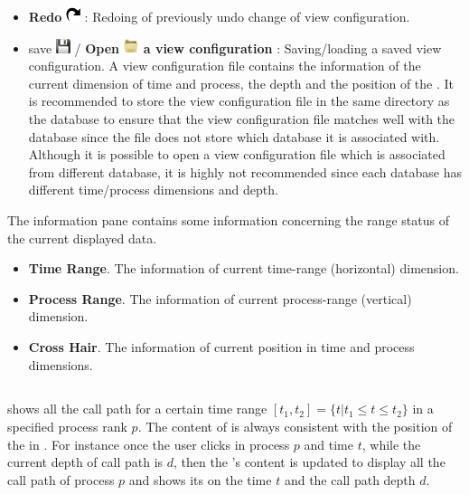 \begin{itemize}
\item \textbf{Redo} \includegraphics[scale=.5]{fig/hpctraceviewer-button-redo.png} : Redoing of previously undo change of view configuration.
\item save \includegraphics[scale=.5]{fig/hpctraceviewer-button-save.png}  / \textbf{Open \includegraphics[scale=.7]{fig/hpctraceviewer-button-open.png} a view configuration} : Saving/loading a saved view configuration. 
A view configuration file contains the information of the current dimension of time and process, the depth and the position of the \crosshair{}. 
It is recommended to store the view configuration file in the same directory as the database to ensure that the view configuration file matches well with the database since the file does not store which database it is associated with. 
Although it is possible to open a view configuration file which is associated from different database, it is highly not recommended since each database has different time/process dimensions and depth.


\end{itemize}

The information pane contains some information concerning the range status of the current displayed data.
\begin{itemize}
 \item \textbf{Time Range}. The information of current time-range (horizontal) dimension. 
 \item \textbf{Process Range}. The information of current process-range (vertical) dimension. 
 \item \textbf{Cross Hair}. The information of current \crosshair{} position in time and process dimensions. 
\end{itemize}

\subsection{\depthview}
\label{sec:depthview}

\depthview{} shows all the call path for a certain time range $[t_1,t_2]= \{t | t_1\leq t\leq t_2\}$ in a specified process rank $p$. The content of \depthview{} is always consistent with the position of the \crosshair{} in \traceview{}.
For instance once the user clicks in process $p$ and time $t$, while the current depth of call path is $d$, then the \depthview's content is updated to display all the call path of process $p$ and shows its \crosshair{} on the time $t$ and the call path depth $d$.

